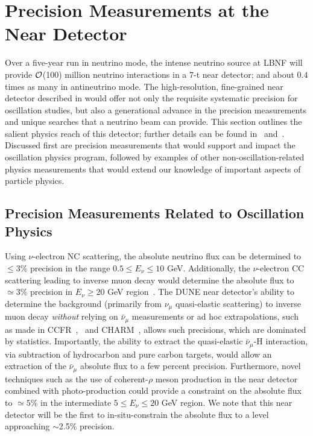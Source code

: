 \section{Precision Measurements at the Near Detector} 
\label{sec-nd-sbp} 

Over a five-year run in neutrino mode, %
the intense neutrino source at LBNF will provide ${\cal {O}}$(100)
million neutrino interactions in a 7-t near detector; and about $0.4$
times as many in antineutrino mode. %
The high-resolution, fine-grained near detector described in \voldune
would offer not only the requisite systematic precision for
oscillation studies, but also a generational advance in the precision
measurements and unique searches that a neutrino beam can provide.
This section outlines the salient physics reach of this detector;
further details can be found in~\cite{DPR}
and~\cite{Adams:2013qkq}. Discussed first are precision measurements
that would support and impact the oscillation physics program,
followed by examples of other non-oscillation-related physics
measurements that would extend our knowledge of important aspects of
particle physics.


\subsection{Precision Measurements Related to Oscillation Physics}


Using $\nu$-electron NC scattering, the absolute neutrino flux can be
determined to $\leq 3\%$ precision in the range $0.5 \leq E_\nu \leq
10$ GeV. Additionally, the $\nu$-electron CC scattering leading to
inverse muon decay would determine the absolute flux to $\simeq 3\%$
precision in $E_\nu \geq 20$ GeV region~\cite{ABS-FLUX}.  The DUNE
near detector's ability to determine the background (primarily from
$\nu_{\mu}$ quasi-elastic scattering) to inverse muon decay
\textit{without} relying on $\bar \nu_\mu$ measurements or ad hoc
extrapolations, such as made in
CCFR~\cite{CCFR-IMD-Mishra-89},~\cite{CCFR-IMD-Mishra-90} and
CHARM~\cite{CHARM-IMD-95}, allows such precisions, which are dominated
by statistics.  Importantly, the ability to extract the quasi-elastic
$\bar \nu_\mu$-H interaction, via subtraction of hydrocarbon and pure
carbon targets, would allow an extraction of the $\bar \nu_\mu$
absolute flux to a few percent precision. Furthermore, novel
techniques such as the use of coherent-$\rho$ meson production in the
near detector combined with photo-production could provide a
constraint on the absolute flux to $\simeq 5\%$ in the intermediate $5
\leq E_\nu \leq 20$ GeV region.  We note that this near detector will
be the first %
to in-situ-constrain the absolute flux to a level approaching
$\sim$2.5\% precision.


